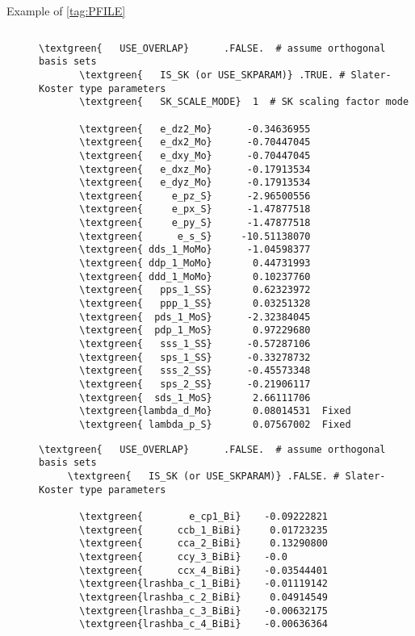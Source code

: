 \documentclass[a4paper,12pt]{scrartcl}
\makeatletter
\def\namedlabel#1#2{\begingroup
    #2%
    \def\@currentlabel{#2}%
    \phantomsection\label{#1}\endgroup
}
\newcommand{\textgreen}[1]{\textcolor{green!50!black}{\texttt{#1}}}
\makeatother
\begin{document}
\begin{description}
    \item[\namedlabel{tag:param-example}{Example of \ref{tag:PFILE}}] $ $\\

\begin{Verbatim}[commandchars=\\\{\},gobble=4, frame=single, framesep=2mm, 
    label= example of PFILE: PARAM\_FIT.dat for MoS$_2$ (IS\_SK  .TRUE.),
    labelposition=bottomline]
       \textgreen{   USE_OVERLAP}      .FALSE.  # assume orthogonal basis sets
       \textgreen{   IS_SK (or USE_SKPARAM)} .TRUE. # Slater-Koster type parameters  
       \textgreen{   SK_SCALE_MODE}  1  # SK scaling factor mode
       
       \textgreen{   e_dz2_Mo}      -0.34636955
       \textgreen{   e_dx2_Mo}      -0.70447045
       \textgreen{   e_dxy_Mo}      -0.70447045
       \textgreen{   e_dxz_Mo}      -0.17913534
       \textgreen{   e_dyz_Mo}      -0.17913534
       \textgreen{     e_pz_S}      -2.96500556
       \textgreen{     e_px_S}      -1.47877518
       \textgreen{     e_py_S}      -1.47877518
       \textgreen{      e_s_S}     -10.51138070
       \textgreen{ dds_1_MoMo}      -1.04598377
       \textgreen{ ddp_1_MoMo}       0.44731993
       \textgreen{ ddd_1_MoMo}       0.10237760
       \textgreen{   pps_1_SS}       0.62323972
       \textgreen{   ppp_1_SS}       0.03251328
       \textgreen{  pds_1_MoS}      -2.32384045
       \textgreen{  pdp_1_MoS}       0.97229680
       \textgreen{   sss_1_SS}      -0.57287106
       \textgreen{   sps_1_SS}      -0.33278732
       \textgreen{   sss_2_SS}      -0.45573348
       \textgreen{   sps_2_SS}      -0.21906117
       \textgreen{  sds_1_MoS}       2.66111706
       \textgreen{lambda_d_Mo}       0.08014531  Fixed
       \textgreen{ lambda_p_S}       0.07567002  Fixed

\end{Verbatim}

\begin{Verbatim}[commandchars=\\\{\},gobble=4, frame=single, framesep=2mm, 
    label= example of PFILE: PARAM\_FIT.dat for Bi/Si(110) (IS\_SK  .FALSE.),
    labelposition=bottomline]
     \textgreen{   USE_OVERLAP}      .FALSE.  # assume orthogonal basis sets   
     \textgreen{   IS_SK (or USE_SKPARAM)} .FALSE. # Slater-Koster type parameters  

       \textgreen{        e_cp1_Bi}    -0.09222821  
       \textgreen{      ccb_1_BiBi}     0.01723235  
       \textgreen{      cca_2_BiBi}     0.13290800  
       \textgreen{      ccy_3_BiBi}    -0.0         
       \textgreen{      ccx_4_BiBi}    -0.03544401  
       \textgreen{lrashba_c_1_BiBi}    -0.01119142  
       \textgreen{lrashba_c_2_BiBi}     0.04914549  
       \textgreen{lrashba_c_3_BiBi}    -0.00632175  
       \textgreen{lrashba_c_4_BiBi}    -0.00636364  

\end{Verbatim}
	

\end{description}
\end{document}
